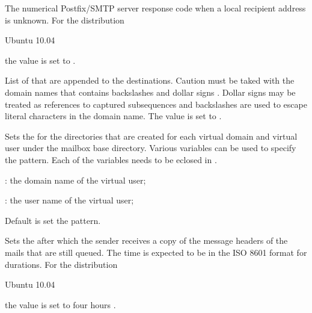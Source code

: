 The numerical Postfix/SMTP server response code when a local recipient 
address is unknown.
For the distribution
\begin{inparaitem}
\item[\TheDistribution{ubuntu}] Ubuntu 10.04
\end{inparaitem}
the value is set to .


List of  that are appended to the destinations.
Caution must be taked with the domain names that contains backslashes \qcode{\textbackslash} and 
dollar signs \qcode{\$}. Dollar signs may be treated as references to 
captured subsequences and backslashes are used to escape literal characters  in the domain name.
The value is set to .


Sets the  for the directories that are created for each virtual
domain and virtual user under the mailbox base directory. 
Various variables can be used to specify the pattern.
Each of the variables needs to be eclosed in \qcode{<>}.
\begin{compactitem}
\item[\qcode{domain}:] the domain name of the virtual user;
\item[\qcode{user}:] the user name of the virtual user;
\end{compactitem}
Default is set the  pattern.


Sets the  after which the sender receives a copy of the message
headers of the mails that are still queued. The time is expected to be in 
the ISO 8601 format for durations.
For the distribution
\begin{inparaitem}
\item[\TheDistribution{ubuntu}] Ubuntu 10.04
\end{inparaitem}
the value is set to four hours .

